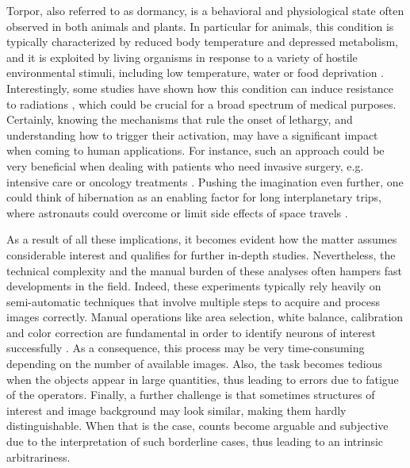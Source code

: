 Torpor, also referred to as dormancy, is a behavioral and physiological state often observed in both animals and plants. 
In particular for animals, this condition is typically characterized by reduced body temperature and depressed metabolism, and it is exploited by living organisms in response to a variety of hostile environmental stimuli, including low temperature, water or food deprivation \cite{GANSLOER2019328, WITHERS2019309}.
Interestingly, some studies have shown how this condition can induce resistance to radiations \cite{CERRI2016space_travel_radioprotection, tinganelli2019hibernation, cerri2021radioresistance}, which could be crucial for a broad spectrum of medical purposes.
Certainly,
knowing the mechanisms that rule the onset of lethargy, and understanding how to trigger their activation,  may have a significant impact when coming to human applications.
For instance, such an approach could be very beneficial when dealing with patients who need invasive surgery, e.g. intensive care or oncology treatments \cite{bouma2012induction, alam2012hypothermia, bellamy1996suspended}.
Pushing the imagination even further, one could think of hibernation as an enabling factor for long interplanetary trips, where astronauts could overcome or limit side effects of space travels \cite{CERRI2016space_travel_radioprotection, CERRI2021cool, puspitasari2021hibernation, bradford2020aerospace}.

As a result of all these implications, it becomes evident how the matter assumes considerable interest and qualifies for further in-depth studies.
Nevertheless, the technical complexity and the manual burden of these analyses often hampers fast developments in the field.
Indeed, these experiments typically rely heavily on semi-automatic techniques that involve multiple steps to acquire and process images correctly.  
Manual operations like area selection, white balance, calibration and color correction are fundamental in order to identify neurons of interest successfully \cite{luppi1, luppi2, luppi3}. 
As a consequence, this process may be very time-consuming depending on the number of available images. 
Also, the task becomes tedious when the objects appear in large quantities, thus leading to errors due to fatigue of the operators.
Finally, a further challenge is that sometimes structures of interest and image background may look similar, making them hardly distinguishable. When that is the case, counts become arguable and subjective due to the interpretation of such borderline cases, thus leading to an intrinsic arbitrariness.

